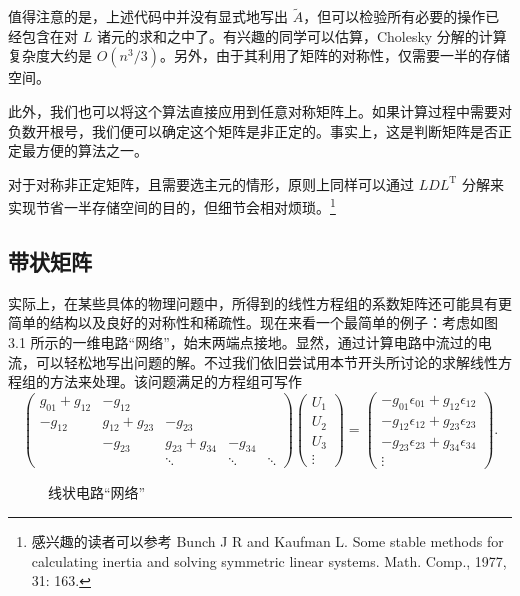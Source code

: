 值得注意的是，上述代码中并没有显式地写出 $\widetilde A$，但可以检验所有必要的操作已经包含在对 $L$ 诸元的求和之中了。有兴趣的同学可以估算，Cholesky 分解的计算复杂度大约是 $O(n^3/3)$。另外，由于其利用了矩阵的对称性，仅需要一半的存储空间。

此外，我们也可以将这个算法直接应用到任意对称矩阵上。如果计算过程中需要对负数开根号，我们便可以确定这个矩阵是非正定的。事实上，这是判断矩阵是否正定最方便的算法之一。

对于对称非正定矩阵，且需要选主元的情形，原则上同样可以通过 $LDL^{\mathrm T}$ 分解来实现节省一半存储空间的目的，但细节会相对烦琐。\footnote{感兴趣的读者可以参考 Bunch J R and Kaufman L. Some stable methods for calculating inertia and solving symmetric linear systems. Math. Comp., 1977, 31: 163.}

\subsection{带状矩阵}

实际上，在某些具体的物理问题中，所得到的线性方程组的系数矩阵还可能具有更简单的结构以及良好的对称性和稀疏性。现在来看一个最简单的例子：考虑如图 3.1 所示的一维电路“网络”，始末两端点接地。显然，通过计算电路中流过的电流，可以轻松地写出问题的解。不过我们依旧尝试用本节开头所讨论的求解线性方程组的方法来处理。该问题满足的方程组可写作
\begin{equation}
\begin{pmatrix}
g_{01}+g_{12}&-g_{12}&&&\\
-g_{12}&g_{12}+g_{23}&-g_{23}&&\\
&-g_{23}&g_{23}+g_{34}&-g_{34}&\\
&&\ddots&\ddots&\ddots
\end{pmatrix}
\begin{pmatrix}U_1\\U_2\\U_3\\\vdots\end{pmatrix}
=
\begin{pmatrix}
-g_{01}\epsilon_{01}+g_{12}\epsilon_{12}\\
-g_{12}\epsilon_{12}+g_{23}\epsilon_{23}\\
-g_{23}\epsilon_{23}+g_{34}\epsilon_{34}\\
\vdots
\end{pmatrix}.
\tag{3.1.25}
\end{equation}

\begin{figure}[htbp]
\centering
{}
\caption{线状电路“网络”}
\label{fig:line-network}
\end{figure}

